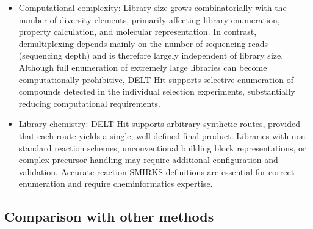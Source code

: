 \documentclass[pdflatex,sn-nature]{sn-jnl}
\begin{document}
\begin{itemize}
  \item Computational complexity: Library size grows combinatorially with the number of diversity elements, primarily affecting library enumeration, property calculation, and molecular representation. In contrast, demultiplexing depends mainly on the number of sequencing reads (sequencing depth) and is therefore largely independent of library size. Although full enumeration of extremely large libraries can become computationally prohibitive, DELT-Hit supports selective enumeration of compounds detected in the individual selection experiments, substantially reducing computational requirements.
  \item Library chemistry: DELT-Hit supports arbitrary synthetic routes, provided that each route yields a single, well-defined final product. Libraries with non-standard reaction schemes, unconventional building block representations, or complex precursor handling may require additional configuration and validation. Accurate reaction SMIRKS definitions are essential for correct enumeration and require cheminformatics expertise.
\end{itemize}

\subsection{Comparison with other methods}
\end{document}
